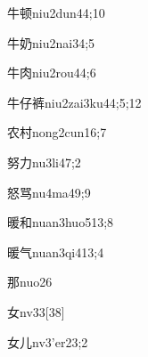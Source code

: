 \begin{verbete}{牛顿}{niu2dun4}{4;10}
\end{verbete}

\begin{verbete}{牛奶}{niu2nai3}{4;5}
\end{verbete}

\begin{verbete}{牛肉}{niu2rou4}{4;6}
\end{verbete}

\begin{verbete}{牛仔裤}{niu2zai3ku4}{4;5;12}
\end{verbete}

\begin{verbete}{农村}{nong2cun1}{6;7}
\end{verbete}

\begin{verbete}{努力}{nu3li4}{7;2}
\end{verbete}

\begin{verbete}{怒骂}{nu4ma4}{9;9}
\end{verbete}

\begin{verbete}{暖和}{nuan3huo5}{13;8}
\end{verbete}

\begin{verbete}{暖气}{nuan3qi4}{13;4}
\end{verbete}

\begin{verbete}{那}{nuo2}{6}
\end{verbete}

\begin{verbete}{女}{nv3}{3}[38]
\end{verbete}

\begin{verbete}{女儿}{nv3'er2}{3;2}
\end{verbete}

